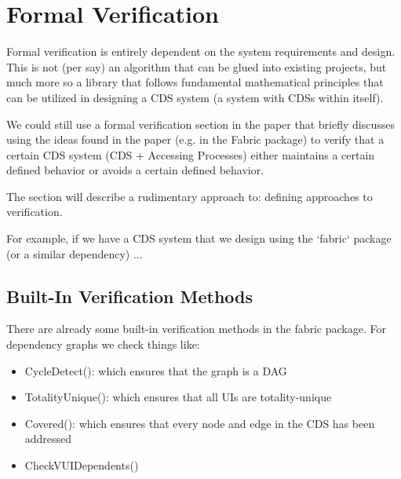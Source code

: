 \section{Formal Verification}

Formal verification is entirely dependent on the system requirements and design. This is not (per say) an algorithm that can be glued into existing projects, but much more so a library that follows fundamental mathematical principles that can be utilized in designing a CDS system (a system with CDSs within itself).

We could still use a formal verification section in the paper that briefly discusses using the ideas found in the paper (e.g. in the Fabric package) to verify that a certain CDS system (CDS + Accessing Processes) either maintains a certain defined behavior or avoids a certain defined behavior.

The section will describe a rudimentary approach to: defining approaches to verification.

For example, if we have a CDS system that we design using the `fabric` package (or a similar dependency) ...

\subsection{Built-In Verification Methods}

There are already some built-in verification methods in the fabric package. For dependency graphs we check things like:

\begin{itemize}
	\item CycleDetect(): which ensures that the graph is a DAG
	\item TotalityUnique(): which ensures that all UIs are totality-unique
	\item Covered(): which ensures that every node and edge in the CDS has been addressed
	\item CheckVUIDependents()
\end{itemize}